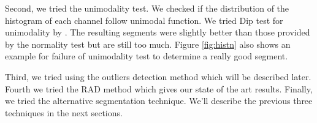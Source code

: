 \documentclass[twoside,11pt]{article}
\begin{document}
Second, we tried the unimodality test. We checked if the distribution of the
histogram of each channel
follow unimodal function. We tried Dip test for unimodality by
\cite{dip-unimodality}. The resulting
segments were slightly better than those provided by the normality test but are
still too much. Figure \ref{fig:histn} also shows an example for failure of
unimodality test to determine a really good segment.

Third, we tried using the outliers detection method which will be described
later. Fourth we tried
the RAD method which gives our state of the art results. Finally, we tried the
alternative segmentation
technique. We'll describe the previous three techniques in the next sections.
\begin{figure}[!t]
\centering
{}
\end{figure}
\end{document}
